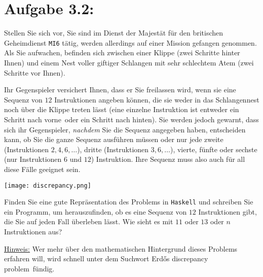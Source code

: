 \documentclass[a4paper,10pt]{scrartcl}
\newcommand{\theuebungszettel}{3}
\begin{document}
\section*{Aufgabe \theuebungszettel.2:}

Stellen Sie sich vor, Sie sind im Dienst der Majestät für den britischen Geheimdienst \texttt{MI6} tätig, werden allerdings auf einer Mission gefangen genommen. Als Sie aufwachen, befinden sich zwischen einer Klippe (zwei Schritte hinter Ihnen) und einem Nest voller giftiger Schlangen mit sehr schlechtem Atem (zwei Schritte vor Ihnen).

Ihr Gegenspieler versichert Ihnen, dass er Sie freilassen wird, wenn sie eine Sequenz von $12$ Instruktionen angeben können, die sie weder in das Schlangennest noch über die Klippe treten lässt (eine einzelne Instruktion ist entweder \glqq ein Schritt nach vorne\grqq\ oder \glqq ein Schritt nach hinten\grqq ). Sie werden jedoch gewarnt, dass sich ihr Gegenspieler, \emph{nachdem} Sie die Sequenz angegeben haben, entscheiden kann, ob Sie die ganze Sequenz ausführen müssen oder nur jede zweite (Instruktionen $2,4,6,\dots$), dritte (Instruktionen $3,6,\dots$), vierte, fünfte oder sechste (nur Instruktionen $6$ und $12$) Instruktion. Ihre Sequenz muss also auch für all diese Fälle geeignet sein. 

\begin{center}
\texttt{[image: discrepancy.png]} 
\end{center}

Finden Sie eine gute Repräsentation des Problems in \texttt{Haskell} und schreiben Sie ein Programm, um herauszufinden, ob es eine Sequenz von $12$ Instruktionen gibt, die Sie auf jeden Fall überleben lässt. Wie sieht es mit $11$ oder $13$ oder $n$ Instruktionen aus?\smallskip

\underline{Hinweis:} Wer mehr über den mathematischen Hintergrund dieses Problems erfahren will, wird schnell unter dem Suchwort \glqq Erdős discrepancy problem\grqq\ fündig.
\end{document}
